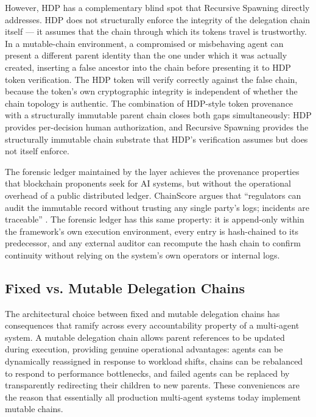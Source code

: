 However, HDP has a complementary blind spot that Recursive Spawning directly addresses.  HDP does not structurally enforce the integrity of the delegation chain itself --- it assumes that the chain through which its tokens travel is trustworthy.  In a mutable-chain environment, a compromised or misbehaving agent can present a different parent identity than the one under which it was actually created, inserting a false ancestor into the chain before presenting it to HDP token verification.  The HDP token will verify correctly against the false chain, because the token's own cryptographic integrity is independent of whether the chain topology is authentic.  The combination of HDP-style token provenance with a structurally immutable parent chain closes both gaps simultaneously: HDP provides per-decision human authorization, and Recursive Spawning provides the structurally immutable chain substrate that HDP's verification assumes but does not itself enforce.

The forensic ledger maintained by the \bxthree{} \fact{} layer achieves the provenance properties that blockchain proponents seek for AI systems, but without the operational overhead of a public distributed ledger.  ChainScore argues that ``regulators can audit the immutable record without trusting any single party's logs; incidents are traceable'' \cite{on_chain_provenance_ai}.  The \bxthree{} forensic ledger has this same property: it is append-only within the framework's own execution environment, every entry is hash-chained to its predecessor, and any external auditor can recompute the hash chain to confirm continuity without relying on the system's own operators or internal logs.

\subsection{Fixed vs. Mutable Delegation Chains}\label{sec:fixed-v-mutable}

The architectural choice between fixed and mutable delegation chains has consequences that ramify across every accountability property of a multi-agent system.  A mutable delegation chain allows parent references to be updated during execution, providing genuine operational advantages: agents can be dynamically reassigned in response to workload shifts, chains can be rebalanced to respond to performance bottlenecks, and failed agents can be replaced by transparently redirecting their children to new parents.  These conveniences are the reason that essentially all production multi-agent systems today implement mutable chains.

